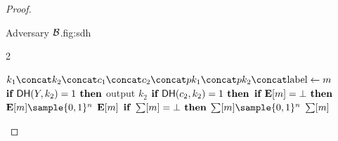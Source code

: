 \begin{proof}
\begin{itemize}
\begin{gamefigure}{Adversary $\mathcal{B}$.}{fig:sdh}
\begin{games}{2}
\begin{gameenv}{\oracledec}
                                                            \State $\hashinput \gets m$
                                                            \State $\textbf{if } \textsf{DH}(Y, k_2) = 1 \textbf{ then}$ \label{line:found_cdh}
                                                                \State \qquad output $k_2$
                                                                \State $\textbf{if } \textsf{DH}(c_2, k_2) = 1 \textbf{ then}$ \label{line:is_valid_query}
                                                                    \State \qquad $\textbf{if } \mathbf{E}[m] = \bot \textbf{ then}$
                                                                        \State \qquad \quad $\pset{E}[m] \sample \bits^{n}$
                                                                        \State \qquad \Return $\mathbf{E}[m]$
                                                                        \State $\textbf{if } \sum[m] = \bot \textbf{ then}$
                                                                            \State \quad $\ROMtable[m] \sample \bits^{n}$
                                                                            \State \Return $\sum[m]$
                                                                        \end{gameenv}
                                                                    \end{games}
                                                                \end{gamefigure}


\end{itemize}
\end{proof}
